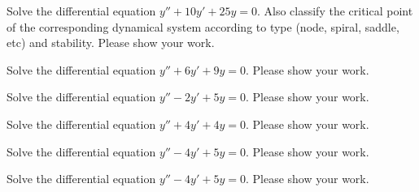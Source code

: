 \ifnum {}
\question[4] Solve the differential equation $y''+10y'+25y = 0$. Also classify the critical point of the corresponding dynamical system according to type (node, spiral, saddle, etc) and stability. Please show your work. 
\fi 

\ifnum {}
\question[4] Solve the differential equation $y''+6y'+9y = 0$. Please show your work. 
\fi 


\ifnum {}
\question[4] Solve the differential equation $y''-2y'+5y = 0$. Please show your work. 
\fi 


\ifnum {}
\question[4] Solve the differential equation $y''+4y'+4y = 0$. Please show your work. 
\fi 


\ifnum {}
\question[4] Solve the differential equation $y''-4y'+5y = 0$. Please show your work. 
\fi 


\ifnum {}
\question[4] Solve the differential equation $y''-4y'+5y = 0$. Please show your work. 
\fi 